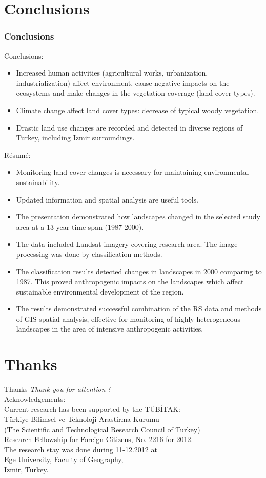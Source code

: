 \documentclass[pdflatex,compress,8pt,
	xcolor={dvipsnames,dvipsnames,svgnames,x11names,table},
	hyperref={
	breaklinks = true, 
	pdfauthor={Lemenkova Polina}, 
	pdfsubject={Preentation}, 
	pdfcreator={Lemenkova Polina}, 
	pdfproducer={Lemenkova Polina}, 
	citecolor=NavyBlue, 
	urlbordercolor=cyan,
	urlcolor = NavyBlue, 
	breaklinks = true}]{beamer}
\begin{document}
\section{Conclusions}
\begin{frame}\frametitle{Conclusions}
Conclusions: 
\begin{itemize}
	\item Increased human activities (agricultural works, urbanization, industrialization) affect environment, cause negative impacts on the ecosystems and make changes in the vegetation coverage (land cover types).
	\item Climate change affect land cover types: decrease of typical woody vegetation.
	\item Drastic land use changes are recorded and detected in diverse regions of Turkey, including Izmir surroundings.
\end{itemize}
R\'{e}sum\'{e}:
\begin{itemize}
	\item Monitoring land cover changes is necessary for maintaining environmental sustainability. 
	\item Updated information and spatial analysis are useful tools.
	\item The presentation demonstrated how landscapes changed in the selected study area at a 13-year time span (1987-2000).
	\item The data included Landsat imagery covering research area. The image processing was done by classification methods.
	\item The classification results detected changes in landscapes in 2000 comparing to 1987. This proved anthropogenic impacts on the landscapes which affect sustainable environmental development of the region.
	\item The results demonstrated successful combination of the RS data and methods of GIS spatial analysis, effective for monitoring of highly heterogeneous landscapes in the area of intensive anthropogenic activities.
\end{itemize}
\end{frame}

\section{Thanks}
\begin{frame}{Thanks}
  	\centering \LARGE 
  	\emph{Thank you for attention !}\\
	\vspace{5em}
\normalsize
Acknowledgements: \\
Current research has been supported by the T\"{U}BİTAK: \\
T\"{u}rkiye Bilimsel ve Teknoloji Arastirma Kurumu\\
(The Scientific and Technological Research Council of Turkey) \\
Research Fellowship for Foreign Citizens, No. 2216 for 2012.\\
The research stay was done during 11-12.2012 at \\
Ege University, Faculty of Geography,\\
Izmir, Turkey.
\end{frame}
\end{document}
